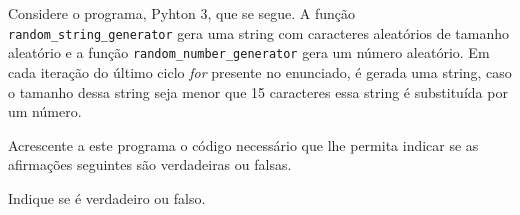 \documentclass[12pt,varwidth=16cm,border=1pt]{standalone}
\begin{document}
Considere o programa, Pyhton 3, que se segue. A função \verb+random_string_generator+ gera uma string com caracteres aleatórios de tamanho aleatório e a função \verb+random_number_generator+ gera um número aleatório. Em cada iteração do último ciclo \textit{for} presente no enunciado, é gerada uma string, caso o tamanho dessa string seja menor que 15 caracteres essa string é substituída por um número.



Acrescente a este programa o código necessário que lhe permita indicar se as
afirmações seguintes são verdadeiras ou falsas.

Indique se é verdadeiro ou falso.
\end{document}
